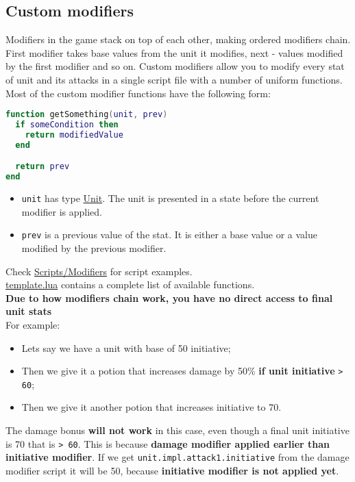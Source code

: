 \subsection{Custom modifiers}
Modifiers in the game stack on top of each other, making ordered modifiers chain.
First modifier takes base values from the unit it modifies, next - values modified by the first modifier and so on.
Custom modifiers allow you to modify every stat of unit and its attacks in a single script file with a number of uniform functions.\\
Most of the custom modifier functions have the following form:
\begin{center}
\begin{lstlisting}[language=Lua]
function getSomething(unit, prev)
  if someCondition then
    return modifiedValue
  end

  return prev
end
\end{lstlisting}
\end{center}
\begin{itemize}
\item \texttt{unit} has type \hyperref[Unit]{Unit}. The unit is presented in a state before the current modifier is applied.
\item \texttt{prev} is a previous value of the stat. It is either a base value or a value modified by the previous modifier.
\end{itemize}
Check \href{https://github.com/VladimirMakeev/D2ModdingToolset/tree/master/Scripts/Modifiers}{Scripts/Modifiers} for script examples.\\
\href{https://github.com/VladimirMakeev/D2ModdingToolset/blob/master/Scripts/Modifiers/template.lua}{template.lua} contains a complete list of available functions.\\

\textbf{Due to how modifiers chain work, you have no direct access to final unit stats}\\
For example:
\begin{itemize}
\item Lets say we have a unit with base of 50 initiative;
\item Then we give it a potion that increases damage by 50\% \textbf{if unit initiative} \texttt{> 60};
\item Then we give it another potion that increases initiative to 70.
\end{itemize}
The damage bonus \textbf{will not work} in this case, even though a final unit initiative is 70 that is \texttt{> 60}. This is because \textbf{damage modifier applied earlier than initiative modifier}.
If we get \texttt{unit.impl.attack1.initiative} from the damage modifier script it will be 50, because \textbf{initiative modifier is not applied yet}.\\

